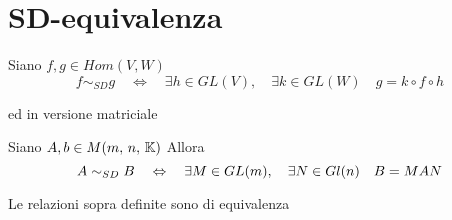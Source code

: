 \section{SD-equivalenza}
\begin{defn}
Siano $f,g \in Hom (V,W)$ 
$$f \sim _{SD} g \quad \Leftrightarrow\quad \exists h \in GL(V),\quad \exists k \in GL(W) \quad g=k\circ f \circ h$$
\end{defn}
ed in versione matriciale 
\begin{defn}
Siano $A,b \in M(m,\, n,\, \mathbb{K}) $ Allora
$$ A\sim_{SD} B \quad \Leftrightarrow \quad \exists M \in GL(m) , \quad \exists N \in Gl(n) \quad B=MAN$$
\end{defn}
\begin{oss}
Le relazioni sopra definite sono di equivalenza 
\end{oss}


